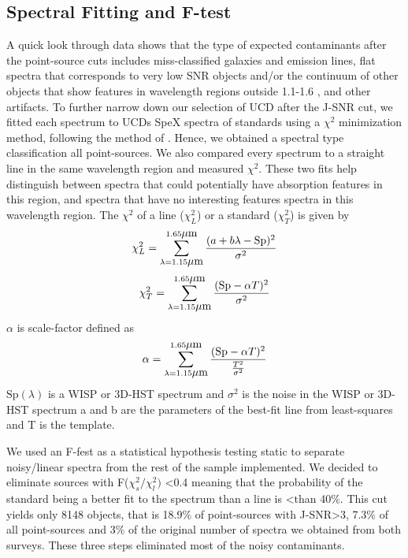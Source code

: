 \documentclass[manuscript]{aastex63}
\begin{document}
\subsection{Spectral Fitting and F-test}
A quick look through data shows that the type of expected contaminants after the point-source cuts includes miss-classified galaxies and emission lines, flat spectra that corresponds to very low SNR objects and/or the continuum of other objects that show features in wavelength regions outside 1.1-1.6 \micron, and other artifacts. To further narrow down our selection of UCD after the J-SNR cut, we fitted each spectrum to UCDs SpeX spectra of standards using a $\chi^2$ minimization method, following the method of \cite{2010ApJS..190..100K}. Hence, we obtained a spectral type classification all point-sources. We also compared every spectrum to a straight line in the same wavelength region and measured $\chi^2$. These two fits help distinguish between spectra that could potentially have absorption features in this region, and spectra that have no interesting features spectra in this wavelength region. The  $\chi^2 $ of a line ($\chi^2 _L $) or a standard ($\chi^2 _T $) is given by 
\begin{equation}
\chi^2 _L  = \sum _{\lambda = 1.15 \micron} ^{ 1.65 \micron} \frac{(a + b \lambda-\text{Sp} )^2}{ \sigma ^2 }
\end{equation}  
\begin{equation}
\chi^2_T= \sum _{\lambda = 1.15 \micron} ^{ 1.65 \micron} \frac{(\text{Sp}  - \alpha T)^2}{ \sigma ^2 }
\end{equation} 
$\alpha$ is scale-factor defined as 
\begin{equation}\alpha= \sum _{\lambda = 1.15 \micron} ^{ 1.65 \micron} \frac{(\text{Sp} - \alpha T)^2}{\frac{T^2}{\sigma ^2 }} 
\end{equation} $\text{Sp}  (\lambda)$ is a WISP or 3D-HST spectrum and $\sigma ^2 $ is the noise in the WISP or 3D-HST spectrum a and b are the parameters of the best-fit line from least-squares and  T is the template.

We used an F-fest as a statistical hypothesis testing static to separate noisy/linear spectra from the rest of the sample implemented. We decided to eliminate sources with F($\chi^2_s/ \chi ^2 _l)$ \textless 0.4 meaning that the probability of the standard being a better fit to the spectrum than a line is \textless than 40\%. This cut yields only 8148 objects, that is 18.9\% of point-sources with J-SNR\textgreater3, 7.3\% of all point-sources and 3\% of the original number of spectra we obtained from both surveys. These three steps eliminated most of the noisy contaminants.
\end{document}
